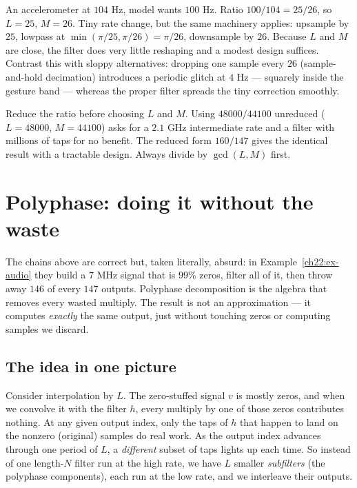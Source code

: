\begin{example}
\label{ch22:ex-imu2}
An accelerometer at $104$ Hz, model wants $100$ Hz. Ratio $100/104 = 25/26$, so
$L=25$, $M=26$. Tiny rate change, but the same machinery applies: upsample by
$25$, lowpass at $\min(\pi/25,\pi/26)=\pi/26$, downsample by $26$. Because $L$ and
$M$ are close, the filter does very little reshaping and a modest design suffices.
Contrast this with sloppy alternatives: dropping one sample every $26$
(sample-and-hold decimation) introduces a periodic glitch at $4$ Hz --- squarely
inside the gesture band --- whereas the proper filter spreads the tiny correction
smoothly.
\end{example}

\begin{trapbox}
Reduce the ratio before choosing $L$ and $M$. Using $48000/44100$ unreduced
($L=48000$, $M=44100$) asks for a $2.1$ GHz intermediate rate and a filter with
millions of taps for no benefit. The reduced form $160/147$ gives the identical
result with a tractable design. Always divide by $\gcd(L,M)$ first.
\end{trapbox}

\section{Polyphase: doing it without the waste}
\label{ch22:polyphase}

The chains above are correct but, taken literally, absurd: in
Example~\ref{ch22:ex-audio} they build a $7$ MHz signal that is $99\%$ zeros,
filter all of it, then throw away $146$ of every $147$ outputs. Polyphase
decomposition is the algebra that removes every wasted multiply. The result is
not an approximation --- it computes \emph{exactly} the same output, just without
touching zeros or computing samples we discard.

\subsection{The idea in one picture}

Consider interpolation by $L$. The zero-stuffed signal $v$ is mostly zeros, and
when we convolve it with the filter $h$, every multiply by one of those zeros
contributes nothing. At any given output index, only the taps of $h$ that happen
to land on the nonzero (original) samples do real work. As the output index
advances through one period of $L$, a \emph{different} subset of taps lights up
each time. So instead of one length-$N$ filter run at the high rate, we have $L$
smaller \emph{subfilters} (the polyphase components), each run at the low rate,
and we interleave their outputs.

